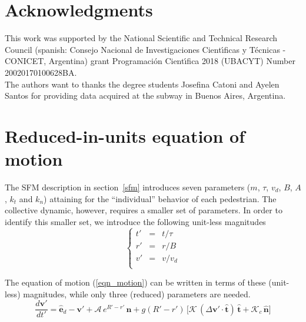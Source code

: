 \documentclass[preprint,12pt]{elsarticle}
\begin{document}
\section*{Acknowledgments}
This work was supported by the National Scientific and Technical 
Research Council (spanish: Consejo Nacional de Investigaciones Cient\'\i ficas 
y T\'ecnicas - CONICET, Argentina) grant Programaci\'on Cient\'\i fica 2018 (UBACYT) Number 20020170100628BA.\\

The authors want to thanks the degree students Josefina Catoni and Ayelen Santos for providing data acquired at 
the subway in Buenos Aires, Argentina. 

\appendix

\section{\label{appendix1}Reduced-in-units equation of motion}

The SFM description in section~\ref{sfm} introduces seven parameters ($m$, 
$\tau$, $v_d$, $B$, $A$, $k_t$ and $k_n$) attaining for the ``individual'' 
behavior of each pedestrian. The collective dynamic, however, requires a 
smaller set of parameters. In order to identify this smaller set, we introduce 
the following unit-less magnitudes\\

\begin{equation}
 \left\{\begin{array}{lcl}
         t' & = & t/\tau \\
         r' & = & r/B \\
         v' & = & v/v_d \\
        \end{array}\right.
\end{equation}

The equation of motion (\ref{eqn_motion}) can be written in terms of these 
(unit-less) magnitudes, while only three (reduced) parameters are needed.\\


\begin{equation}
 \displaystyle\frac{d\mathbf{v}'}{dt'}=
 \hat{\mathbf{e}}_d-\mathbf{v}'+\mathcal{A}\,e^{R'-r'}\,
 \hat{\mathbf{n}}+g(R'-r')\,\bigg[\mathcal{K}\,(\Delta\mathbf{v}'\cdot
 \hat{\mathbf{t}})\,\hat{\mathbf{t}}+\mathcal{K}_c\,\hat{\mathbf{n}}\bigg]
\end{equation}
\end{document}
